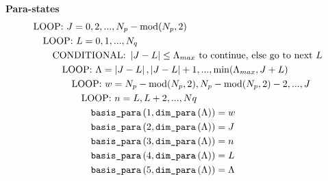 \documentclass[english,twoside, openright]{report}
\newcommand{\Abs}[1]{
  \left|#1\right|
}
\begin{document}
\textbf{Para-states}
\begin{align} &\text{LOOP: } J=0,2,..., N_p-\text{mod}(N_p,2)
  \nonumber \\ & \quad\text{LOOP: }L=0,1,...,N_q \nonumber \\ &
  \quad\quad\text{CONDITIONAL: } \Abs{J-L}\leq \Lambda_{max} \text{ to
                                                                continue, else go to next }L \nonumber \\
              &\quad\quad\quad\text{LOOP: }
                \Lambda=\Abs{J-L},\Abs{J-L}+1,...,\min(\Lambda_{max},J+L)
                \nonumber
  \\ &\quad\quad\quad\quad\text{LOOP: } w=N_p-\text{mod}(N_p,2), N_p-\text{mod}(N_p,2)-2,... ,J\nonumber \\
              &\quad\quad\quad\quad\quad\text{LOOP: } n=L,L+2,...,Nq \\
              &\quad\quad\quad\quad\quad\quad
                \text{\texttt{basis\_para}}\left(1,\text{\texttt{dim\_para}}\left(\Lambda\right)\right)=w
                \nonumber \\ &\quad\quad\quad\quad\quad\quad
                               \text{\texttt{basis\_para}}\left(2,\text{\texttt{dim\_para}}\left(\Lambda\right)\right)=J
                               \nonumber \\
              &\quad\quad\quad\quad\quad\quad
                \text{\texttt{basis\_para}}\left(3,\text{\texttt{dim\_para}}\left(\Lambda\right)\right)=n
                \nonumber \\ &\quad\quad\quad\quad\quad\quad
                               \text{\texttt{basis\_para}}\left(4,\text{\texttt{dim\_para}}\left(\Lambda\right)\right)=L
                               \nonumber \\
              &\quad\quad\quad\quad\quad\quad
                \text{\texttt{basis\_para}}\left(5,\text{\texttt{dim\_para}}\left(\Lambda\right)\right)=\Lambda
                \nonumber
\end{align}
\end{document}
